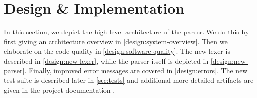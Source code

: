 
\section{Design \& Implementation}
\label{sec:design-implementation} 
In this section, we depict the high-level architecture of the parser.
We do this by first giving an architecture overview in \autoref{design:system-overview}.
Then we elaborate on the code quality in \autoref{design:software-quality}.
The new lexer is described in \autoref{design:new-lexer}, while the parser itself is depicted in \autoref{design:new-parser}.
Finally, improved error messages are covered in \autoref{design:errors}.
The new test suite is described later in \autoref{sec:tests} and additional more detailed artifacts are given in the project documentation .





